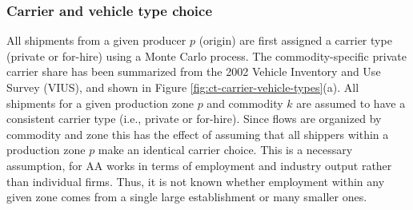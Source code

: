 \subsubsection{Carrier and vehicle type choice}
All shipments from a given producer $p$ (origin) are first assigned a carrier type (private or for-hire) using a Monte Carlo process. The commodity-specific private carrier share has been summarized from the 2002 Vehicle Inventory and Use Survey (VIUS), and shown in Figure \ref{fig:ct-carrier-vehicle-types}(a). All shipments for a given production zone $p$ and commodity $k$ are assumed to have a consistent carrier type (i.e., private or for-hire). Since flows are organized by commodity and zone this has the effect of assuming that all shippers within a production zone $p$ make an identical carrier choice. This is a necessary assumption, for AA works in terms of employment and industry output rather than individual firms. Thus, it is not known whether employment within any given zone comes from a single large establishment or many smaller ones.

